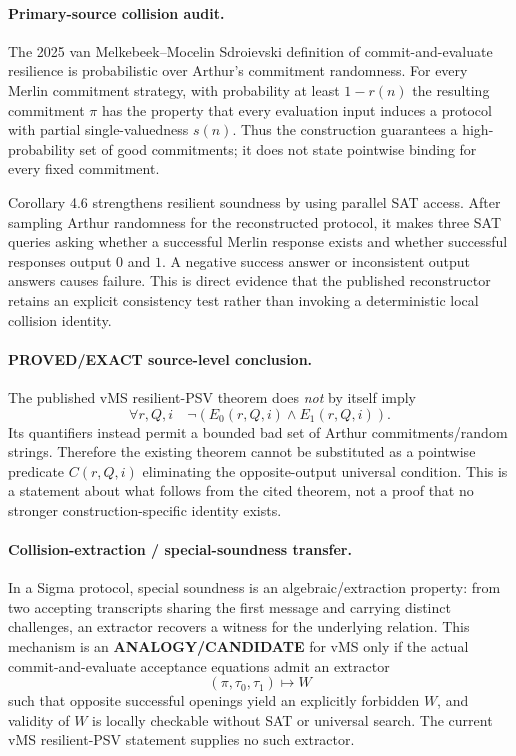 \documentclass[11pt]{article}
\begin{document}
\paragraph{Primary-source collision audit.}
The 2025 van Melkebeek--Mocelin Sdroievski definition of commit-and-evaluate resilience is probabilistic over Arthur's commitment randomness. For every Merlin commitment strategy, with probability at least $1-r(n)$ the resulting commitment $\pi$ has the property that every evaluation input induces a protocol with partial single-valuedness $s(n)$. Thus the construction guarantees a high-probability set of good commitments; it does not state pointwise binding for every fixed commitment.

Corollary 4.6 strengthens resilient soundness by using parallel SAT access. After sampling Arthur randomness for the reconstructed protocol, it makes three SAT queries asking whether a successful Merlin response exists and whether successful responses output $0$ and $1$. A negative success answer or inconsistent output answers causes failure. This is direct evidence that the published reconstructor retains an explicit consistency test rather than invoking a deterministic local collision identity.

\paragraph{PROVED/EXACT source-level conclusion.}
The published vMS resilient-PSV theorem does \emph{not} by itself imply
\[
\forall r,Q,i\quad \neg(E_0(r,Q,i)\wedge E_1(r,Q,i)).
\]
Its quantifiers instead permit a bounded bad set of Arthur commitments/random strings. Therefore the existing theorem cannot be substituted as a pointwise predicate $C(r,Q,i)$ eliminating the opposite-output universal condition. This is a statement about what follows from the cited theorem, not a proof that no stronger construction-specific identity exists.

\paragraph{Collision-extraction / special-soundness transfer.}
In a Sigma protocol, special soundness is an algebraic/extraction property: from two accepting transcripts sharing the first message and carrying distinct challenges, an extractor recovers a witness for the underlying relation. This mechanism is an \textbf{ANALOGY/CANDIDATE} for vMS only if the actual commit-and-evaluate acceptance equations admit an extractor
\[
(\pi,\tau_0,\tau_1)\mapsto W
\]
such that opposite successful openings yield an explicitly forbidden $W$, and validity of $W$ is locally checkable without SAT or universal search. The current vMS resilient-PSV statement supplies no such extractor.
\end{document}
